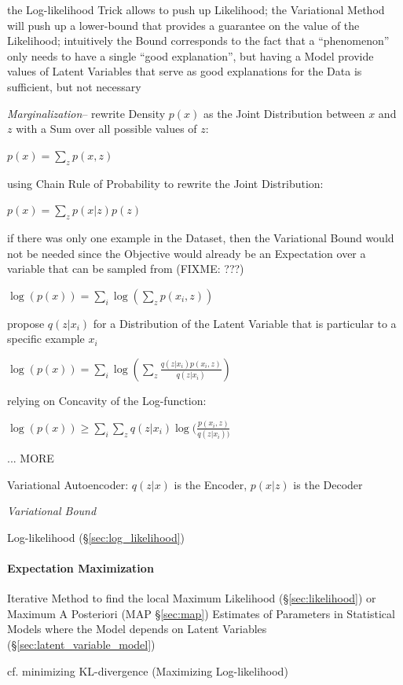 the Log-likelihood Trick allows to push up Likelihood; the Variational Method
will push up a lower-bound that provides a guarantee on the value of the
Likelihood; intuitively the Bound corresponds to the fact that a ``phenomenon''
only needs to have a single ``good explanation'', but having a Model provide
values of Latent Variables that serve as good explanations for the Data is
sufficient, but not necessary

\emph{Marginalization}-- rewrite Density $p(x)$ as the Joint Distribution
between $x$ and $z$ with a Sum over all possible values of $z$:

$p(x) = \sum_z p(x,z)$

using Chain Rule of Probability to rewrite the Joint Distribution:

$p(x) = \sum_z p(x|z)p(z)$

if there was only one example in the Dataset, then the Variational Bound would
not be needed since the Objective would already be an Expectation over a
variable that can be sampled from (FIXME: ???)

$\log(p(x)) = \sum_i \log(\sum_z p(x_i, z))$

propose $q(z|x_i)$ for a Distribution of the Latent Variable that is particular
to a specific example $x_i$

$\log(p(x)) = \sum_i \log(\sum_z \frac{q(z|x_i)p(x_i,z)}{q(z|x_i)})$

relying on Concavity of the Log-function:

$\log(p(x)) \geq \sum_i \sum_z q(z|x_i) \log(\frac{p(x_i,z)}{q(z|x_i))}$

... MORE

Variational Autoencoder: $q(z|x)$ is the Encoder, $p(x|z)$ is the Decoder

\emph{Variational Bound}

Log-likelihood (\S\ref{sec:log_likelihood})



\paragraph{Expectation Maximization}\label{sec:expectation_maximization}\hfill

Iterative Method to find the local Maximum Likelihood (\S\ref{sec:likelihood})
or Maximum A Posteriori (MAP \S\ref{sec:map}) Estimates of Parameters in
Statistical Models where the Model depends on Latent Variables
(\S\ref{sec:latent_variable_model})

cf. minimizing KL-divergence (Maximizing Log-likelihood)


